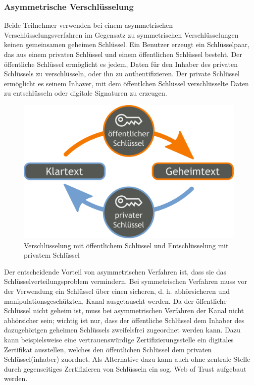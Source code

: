 \documentclass[a4paper,10pt,DIV9, BCOR12mm, oneside,openright,openbib]{scrreprt}
\theoremstyle{definition}
\theoremstyle{plain}
\begin{document}
\subsubsection{Asymmetrische Verschlüsselung}
Beide Teilnehmer verwenden bei einem asymmetrischen Verschlüsselungsverfahren im Gegensatz zu symmetrischen Verschlüsselungen keinen gemeinsamen geheimen Schlüssel. Ein Benutzer erzeugt ein Schlüsselpaar, das aus einem privaten Schlüssel und einem öffentlichen Schlüssel besteht. Der öffentliche Schlüssel ermöglicht es jedem, Daten für den Inhaber des privaten Schlüssels zu verschlüsseln, oder ihn zu authentifizieren. Der private Schlüssel ermöglicht es seinem Inhaver, mit dem öffentlchen Schlüssel verschlüsselte Daten zu entschlüsseln oder digitale Signaturen zu erzeugen.
\begin{figure}[h!]
 \centering
 \includegraphics[bb=0 0 512 325,scale=0.4,keepaspectratio=true]{./Bilder/Orange_blue_public_key_cryptography_de.png}
 \caption{Verschlüsselung mit öffentlichem Schlüssel und Entschlüsselung mit privatem Schlüssel}
 \label{fig:asyV}
\end{figure}
Der entscheidende Vorteil von asymmetrischen Verfahren ist, dass sie das Schlüsselverteilungsproblem vermindern. Bei symmetrischen Verfahren muss vor der Verwendung ein Schlüssel über einen sicheren, d. h. abhörsicheren und manipulationsgeschützten, Kanal ausgetauscht werden. Da der öffentliche Schlüssel nicht geheim ist, muss bei asymmetrischen Verfahren der Kanal nicht abhörsicher sein; wichtig ist nur, dass der öffentliche Schlüssel dem Inhaber des dazugehörigen geheimen Schlüssels zweifelsfrei zugeordnet werden kann. Dazu kann beispielsweise eine vertrauenswürdige Zertifizierungsstelle ein digitales Zertifikat ausstellen, welches den öffentlichen Schlüssel dem privaten Schlüssel(inhaber) zuordnet. Als Alternative dazu kann auch ohne zentrale Stelle durch gegenseitiges Zertifizieren von Schlüsseln ein sog. Web of Trust aufgebaut werden.
\end{document}
